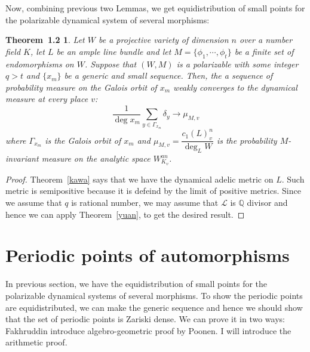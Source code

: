 \documentclass[11pt,letterpaper]{amsart}
\newtheorem*{thm*}{Theorem~1.2}
\begin{document}
    Now, combining previous two Lemmas, we get equidistribution of small points for the polarizable dynamical system of several morphisms:

     \begin{thm*}
        Let $W$ be a projective variety of dimension $n$ over a number field $K$, let $L$ be an ample line bundle and let $M= \{ \phi_1, \cdots, \phi_t\}$ be a finite set of endomorphisms on $W$. Suppose that $(W,M)$ is a polarizable with some integer $q>t$ and $\{ x_m\}$ be a generic and small sequence. Then, the a sequence of probability measure on the Galois orbit of $x_m$ weakly converges to the dynamical measure at every place $v$:
        \[
        \dfrac{1}{\deg x_m} \sum_{y\in \Gamma_{x_m}} \delta_y \rightarrow \mu_{M,v}
        \]
        where $\Gamma_{x_m}$ is the Galois orbit of $x_m$ and $\mu_{M,v} = \dfrac{c_1(L)^n_v}{\deg_L W}$ is the probability $M$-invariant measure on the analytic space $W_{K_v}^{an}$.
    \end{thm*}
    \begin{proof}
        Theorem~\ref{kawa} says that we have the dynamical adelic metric on $L$. Such metric is semipositive because it is defeind by the limit of positive metrics.
         Since we assume that $q$ is rational number, we may assume that $\mathcal{L}$ is $\mathbb{Q}$ divisor and hence we can apply Theorem~\ref{yuan}, to get the desired result.
    \end{proof}

\section{Periodic points of automorphisms}

       In previous section, we have the equidistribution of small points for the polarizable dynamical systems of several morphisms. To show the periodic points are equidistributed, we can make the generic sequence and hence we should show that the set of periodic points is Zariski dense. We can prove it in two ways: Fakhruddin \cite{Fa} introduce algebro-geometric proof by Poonen. I will introduce the arithmetic proof.
\end{document}
